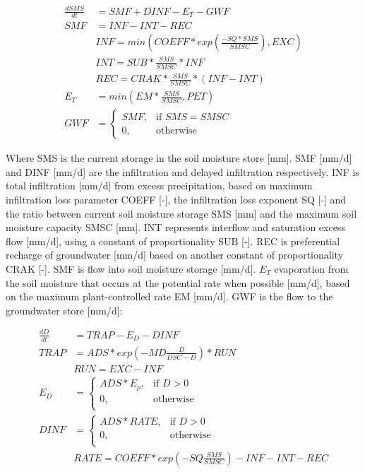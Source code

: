 \vspace{1cm}
\begin{align}
	\frac{dSMS}{dt} &= SMF+DINF-E_T-GWF\\
	SMF &= INF-INT-REC\\
		&INF = min\left(COEFF * exp\left(\frac{-SQ*SMS}{SMSC}\right),EXC\right)\\
		&INT = SUB*\frac{SMS}{SMSC} * INF \\
		&REC = CRAK*\frac{SMS}{SMSC}*(INF-INT)\\	
	E_T &=min\left(EM*\frac{SMS}{SMSC},PET\right)\\
	GWF &= \begin{cases}
		SMF, &\text{if } SMS = SMSC\\
		0, &\text{otherwise}
	\end{cases}
\end{align}

Where SMS is the current storage in the soil moisture store [mm]. SMF [mm/d] and DINF [mm/d] are the infiltration and delayed infiltration respectively. INF is total infiltration [mm/d] from excess precipitation, based on maximum infiltration loss parameter COEFF [-], the infiltration loss exponent SQ [-] and the ratio between current soil moisture storage SMS [mm] and the maximum soil moisture capacity SMSC [mm]. INT represents interflow and saturation excess flow [mm/d], using a constant of proportionality SUB [-]. REC is preferential recharge of groundwater [mm/d] based on another constant of proportionality CRAK [-]. SMF is flow into soil moisture storage [mm/d]. $E_T$ evaporation from the soil moisture that occurs at the potential rate when possible [mm/d], based on the maximum plant-controlled rate EM [mm/d]. GWF is the flow to the groundwater store [mm/d]:

\begin{align}
	\frac{dD}{dt} &= TRAP - E_D - DINF \\
	TRAP &= ADS*exp\left(-MD\frac{D}{DSC-D}\right)*RUN\\
		&RUN = EXC-INF\\
	E_D &= \begin{cases}
			ADS*E_p, &\text{if } D > 0 \\
			0, &\text{otherwise} \\
		\end{cases}\\
	DINF &= \begin{cases}
			ADS*RATE, &\text{if }  D > 0\\
			0, &\text{otherwise} \\
		\end{cases} \\
		&RATE = COEFF*exp\left(-SQ\frac{SMS}{SMSC}\right) - INF-INT-REC
\end{align}

